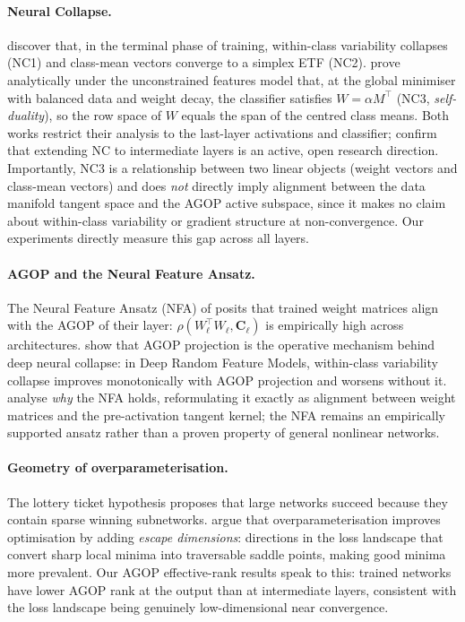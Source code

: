 \documentclass{article}
\newcommand{\AGOP}{\mathbf{C}}          %
\begin{document}
\paragraph{Neural Collapse.}
\citet{papyan2020prevalence} discover that, in the terminal phase of training,
within-class variability collapses (NC1) and class-mean vectors converge to a
simplex ETF (NC2).  \citet{zhu2021geometric} prove analytically under the
unconstrained features model that, at the global minimiser with balanced data
and weight decay, the classifier satisfies $W = \alpha M^\top$ (NC3,
\emph{self-duality}), so the row space of $W$ equals the span of the centred
class means.  Both works restrict their analysis to the last-layer activations and
classifier; \citet{parker2023intermediate} confirm that extending NC to
intermediate layers is an active, open research direction.  Importantly, NC3 is
a relationship between two linear objects (weight vectors and class-mean vectors)
and does \emph{not} directly imply alignment between the data manifold tangent
space and the AGOP active subspace, since it makes no claim about within-class
variability or gradient structure at non-convergence.  Our experiments directly
measure this gap across all layers.

\paragraph{AGOP and the Neural Feature Ansatz.}
The Neural Feature Ansatz (NFA) of \citet{radhakrishnan2024mechanism} posits
that trained weight matrices align with the AGOP of their layer:
$\rho(W_\ell^\top W_\ell, \AGOP_\ell)$ is empirically high across
architectures.  \citet{beaglehole2024agop} show that AGOP projection is the
operative mechanism behind deep neural collapse: in Deep Random Feature
Models, within-class variability collapse improves monotonically with AGOP
projection and worsens without it.  \citet{beaglehole2024nfa} analyse
\emph{why} the NFA holds, reformulating it exactly as alignment between
weight matrices and the pre-activation tangent kernel; the NFA remains an
empirically supported ansatz rather than a proven property of general
nonlinear networks.

\paragraph{Geometry of overparameterisation.}
The lottery ticket hypothesis \citep{frankle2019lottery} proposes that large
networks succeed because they contain sparse winning subnetworks.
\citet{martinelli2026escape} argue that overparameterisation improves
optimisation by adding \emph{escape dimensions}: directions in the loss
landscape that convert sharp local minima into traversable saddle points, making
good minima more prevalent.  Our AGOP effective-rank results speak to this:
trained networks have lower AGOP rank at the output than at intermediate layers,
consistent with the loss landscape being genuinely low-dimensional near
convergence.
\end{document}
